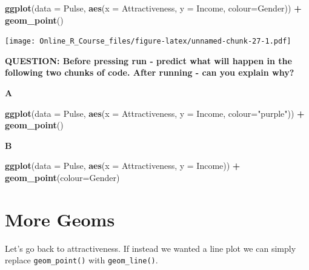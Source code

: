 \documentclass[]{book}
\newenvironment{Shaded}{\begin{snugshade}}{\end{snugshade}}
\newcommand{\DataTypeTok}[1]{\textcolor[rgb]{0.13,0.29,0.53}{#1}}
\newcommand{\KeywordTok}[1]{\textcolor[rgb]{0.13,0.29,0.53}{\textbf{#1}}}
\newcommand{\NormalTok}[1]{#1}
\newcommand{\OperatorTok}[1]{\textcolor[rgb]{0.81,0.36,0.00}{\textbf{#1}}}
\newcommand{\StringTok}[1]{\textcolor[rgb]{0.31,0.60,0.02}{#1}}
\begin{document}
\begin{Shaded}
\begin{Highlighting}[]
\KeywordTok{ggplot}\NormalTok{(}\DataTypeTok{data =}\NormalTok{ Pulse,  }\KeywordTok{aes}\NormalTok{(}\DataTypeTok{x =}\NormalTok{ Attractiveness, }\DataTypeTok{y =}\NormalTok{ Income, }\DataTypeTok{colour=}\NormalTok{Gender)) }\OperatorTok{+}\StringTok{ }
\StringTok{  }\KeywordTok{geom_point}\NormalTok{()}
\end{Highlighting}
\end{Shaded}

\texttt{[image: Online\_R\_Course\_files/figure-latex/unnamed-chunk-27-1.pdf]}

\textbf{QUESTION: Before pressing run - predict what will happen in the following two chunks of code. After running - can you explain why?}

\textbf{A}

\begin{Shaded}
\begin{Highlighting}[]
\KeywordTok{ggplot}\NormalTok{(}\DataTypeTok{data =}\NormalTok{ Pulse,  }\KeywordTok{aes}\NormalTok{(}\DataTypeTok{x =}\NormalTok{ Attractiveness, }\DataTypeTok{y =}\NormalTok{ Income, }\DataTypeTok{colour=}\StringTok{"purple"}\NormalTok{)) }\OperatorTok{+}\StringTok{ }
\StringTok{  }\KeywordTok{geom_point}\NormalTok{()}
\end{Highlighting}
\end{Shaded}

\textbf{B}

\begin{Shaded}
\begin{Highlighting}[]
\KeywordTok{ggplot}\NormalTok{(}\DataTypeTok{data =}\NormalTok{ Pulse,  }\KeywordTok{aes}\NormalTok{(}\DataTypeTok{x =}\NormalTok{ Attractiveness, }\DataTypeTok{y =}\NormalTok{ Income)) }\OperatorTok{+}\StringTok{ }
\StringTok{  }\KeywordTok{geom_point}\NormalTok{(}\DataTypeTok{colour=}\NormalTok{Gender)}
\end{Highlighting}
\end{Shaded}

\hypertarget{more-geoms}{%
\section{More Geoms}\label{more-geoms}}

Let's go back to attractiveness. If instead we wanted a line plot we can simply replace \texttt{geom\_point()} with \texttt{geom\_line()}.
\end{document}
